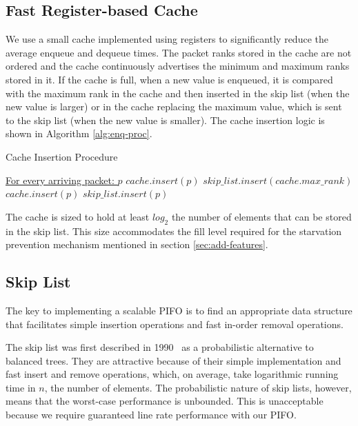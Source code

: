 \subsection{Fast Register-based Cache}\label{sec:reg-cache}

We use a small cache implemented using registers to significantly reduce the average enqueue and dequeue times.  The packet ranks stored in the cache are not ordered and the cache continuously advertises the minimum and maximum ranks stored in it. If the cache is full, when a new value is enqueued, it is compared with the maximum rank in the cache and then inserted in the skip list (when the new value is larger) or in the cache replacing the maximum value, which is sent to the skip list (when the new value is smaller). The cache insertion logic is shown in Algorithm \ref{alg:enq-proc}.

\begin{algorithm}
\footnotesize
\caption{Cache Insertion Procedure}\label{alg:enq-proc}
\begin{algorithmic}[1]
  \State \underline{For every arriving packet: $p$}
   \State $cache.insert(p)$
  \Else 
     \State $skip\_list.insert(cache.max\_rank)$
     \State $cache.insert(p)$
    \Else
     \State $skip\_list.insert(p)$
    \EndIf
  \EndIf
\end{algorithmic}
\end{algorithm}

The cache is sized to hold at least $log_2$ the number of elements that can be stored in the skip list.  This size accommodates the fill level required for the starvation prevention mechanism mentioned in section \ref{sec:add-features}.

\subsection{Skip List}\label{sec:skip-list-impl}

The key to implementing a scalable PIFO is to find an appropriate data structure that facilitates simple insertion operations and fast in-order removal operations.

The skip list was first described in 1990~\cite{skip-list-1990} as a probabilistic alternative to balanced trees. They are attractive because of their simple implementation and fast insert and remove operations, which, on average, take logarithmic running time in $n$, the number of elements. The probabilistic nature of skip lists, however, means that the worst-case performance is unbounded. This is unacceptable because we require guaranteed line rate performance with our PIFO. 

